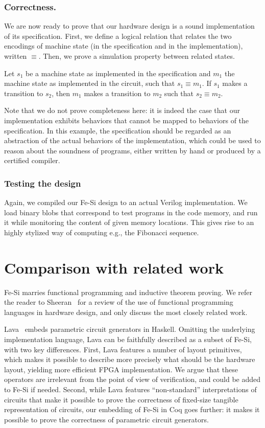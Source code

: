 \documentclass{llncs}
\begin{document}
\subsubsection{Correctness.} We are now ready to prove that our
hardware design is a sound implementation of its specification. 
%
First, we define a logical relation that relates the two
encodings of machine state (in the specification and in the
implementation), written $\equiv$. 
%
Then, we prove a simulation property between related states.
\begin{theorem}
  Let $s_1$ be a machine state as implemented in the specification and
  $m_1$ the machine state as implemented in the circuit, such that
  $s_1 \equiv m_1$.
%
  If $s_1$ makes a transition to $s_2$, then $m_1$ makes a transition
  to $m_2$ such that $s_2 \equiv m_2$.
\end{theorem}
Note that we do not prove completeness here: it is indeed the case
that our implementation exhibits behaviors that cannot be mapped to
behaviors of the specification. 
%
In this example, the specification should be regarded as an
abstraction of the actual behaviors of the implementation, which could
be used to reason about the soundness of programs, either written by
hand or produced by a certified compiler.
%

\subsubsection{Testing the design}
Again, we compiled our Fe-Si design to an actual Verilog
implementation. We load binary blobs that correspond to test programs
in the code memory, and run it while monitoring the content of given
memory locations. This gives rise to an highly stylized way of
computing e.g., the Fibonacci sequence.

\section{Comparison with related work}\label{sec:rw}
Fe-Si marries functional programming and inductive theorem proving.
%
We refer the reader to Sheeran~\cite{DBLP:journals/jucs/Sheeran05} for
a review of the use of functional programming languages in hardware
design, and only discuss the most closely related work.

\medskip

Lava~\cite{Bjesse98lava:hardware} embeds parametric circuit generators
in Haskell. 
%
Omitting the underlying implementation language, Lava can be
faithfully described as a subset of Fe-Si, with two key differences.
%
First, Lava features a number of layout primitives, which makes it
possible to describe more precisely what should be the hardware
layout, yielding more efficient FPGA implementation. We argue that
these operators are irrelevant from the point of view of verification,
and could be added to Fe-Si if needed.
%
Second, while Lava features ``non-standard'' interpretations of
circuits that make it possible to prove the correctness of fixed-size
tangible representation of circuits, our embedding of Fe-Si in Coq
goes further: it makes it possible to prove the correctness of
parametric circuit generators.
\end{document}
